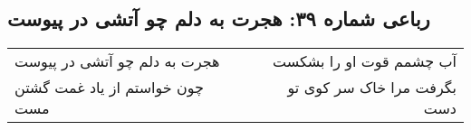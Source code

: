 \begin{center}
\section*{رباعی شماره ۳۹: هجرت به دلم چو آتشی در پیوست}
\label{sec:sh039}
\begin{longtable}{l p{0.5cm} r}
هجرت به دلم چو آتشی در پیوست
&&
آب چشمم قوت او را بشکست
\\
چون خواستم از یاد غمت گشتن مست
&&
بگرفت مرا خاک سر کوی تو دست
\\
\end{longtable}
\end{center}
